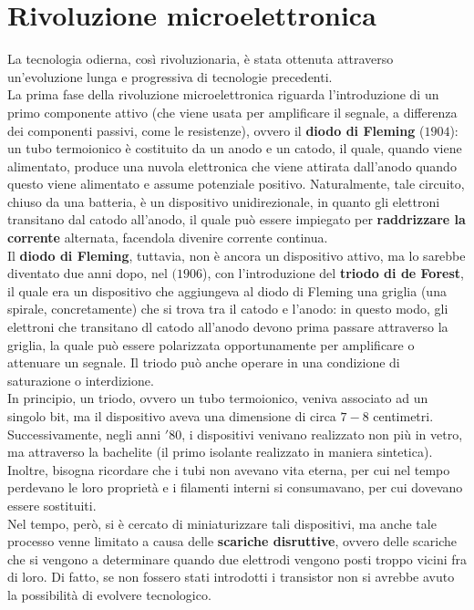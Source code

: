 \documentclass[a4paper]{extarticle}
\begin{document}
\section{Rivoluzione microelettronica}
La tecnologia odierna, così rivoluzionaria, è stata ottenuta attraverso un'evoluzione lunga e progressiva di tecnologie precedenti.\\
La prima fase della rivoluzione microelettronica riguarda l'introduzione di un primo componente attivo (che viene usata per amplificare il segnale, a differenza dei componenti passivi, come le resistenze), ovvero il \textbf{diodo di Fleming} (\(1904\)): un tubo termoionico è costituito da un anodo e un catodo, il quale, quando viene alimentato, produce una nuvola elettronica che viene attirata dall'anodo quando questo viene alimentato e assume potenziale positivo. Naturalmente, tale circuito, chiuso da una batteria, è un dispositivo unidirezionale, in quanto gli elettroni transitano dal catodo all'anodo, il quale può essere impiegato per \textbf{raddrizzare la corrente} alternata, facendola divenire corrente continua.\\
Il \textbf{diodo di Fleming}, tuttavia, non è ancora un dispositivo attivo, ma lo sarebbe diventato due anni dopo, nel \((1906\)), con l'introduzione del \textbf{triodo di de Forest}, il quale era un dispositivo che aggiungeva al diodo di Fleming una griglia (una spirale, concretamente) che si trova tra il catodo e l'anodo: in questo modo, gli elettroni che transitano dl catodo all'anodo devono prima passare attraverso la griglia, la quale può essere polarizzata opportunamente per amplificare o attenuare un segnale. Il triodo può anche operare in una condizione di saturazione o interdizione.\\
In principio, un triodo, ovvero un tubo termoionico, veniva associato ad un singolo bit, ma il dispositivo aveva una dimensione di circa \(7-8\) centimetri.\\
Successivamente, negli anni \('80\), i dispositivi venivano realizzato non più in vetro, ma attraverso la bachelite (il primo isolante realizzato in maniera sintetica). Inoltre, bisogna ricordare che i tubi non avevano vita eterna, per cui nel tempo perdevano le loro proprietà e i filamenti interni si consumavano, per cui dovevano essere sostituiti.\\
Nel tempo, però, si è cercato di miniaturizzare tali dispositivi, ma anche tale processo venne limitato a causa delle \textbf{scariche disruttive}, ovvero delle scariche che si vengono a determinare quando due elettrodi vengono posti troppo vicini fra di loro. Di fatto, se non fossero stati introdotti i transistor non si avrebbe avuto la possibilità di evolvere tecnologico.
\end{document}
